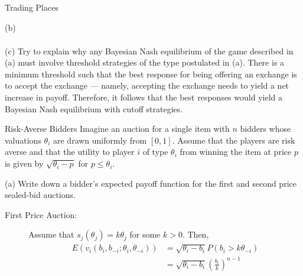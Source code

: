 \documentclass[9pt]{extarticle}
\begin{document}
\begin{problem}{Trading Places}
\begin{problem}{(b)}
\begin{align*}
      \end{align*}
    \end{problem}
    \begin{problem}{(c)}
      Try to explain why any Bayesian Nash equilibrium of the game described in (a) must involve threshold strategies of the type postulated in (a).
      \tcblower
      There is a minimum threshold such that the best response for being offering an exchange is to accept the exchange --- namely, accepting the exchange needs to yield a net increase in payoff. Therefore, it follows that the best responses would yield a Bayesian Nash equilibrium with cutoff strategies.
    \end{problem}
  \end{problem}
  \begin{problem}{Risk-Averse Bidders}
    Imagine an auction for a single item with $n$ bidders whose valuations $\theta_i$ are drawn uniformly from $[0,1]$. Assume that the players are risk averse and that the utility to player $i$ of type $\theta_i$ from winning the item at price $p$ is given by $\sqrt{\theta_i-p}$ for $p \leq \theta_i$.
    \tcblower
    \begin{problem}{(a)}
      Write down a bidder's expected payoff function for the first and second price sealed-bid auctions.
      \tcblower
      \begin{description}
        \item[First Price Auction:] Assume that $s_j(\theta_j) = k\theta_j$ for some $k > 0$. Then,
          \begin{align*}
            E\left(v_i(b_i,b_{-i};\theta_i,\theta_{-i})\right) &= \sqrt{\theta_i - b_i}P(b_i > k\theta_{-i})\\
                                                               &= \sqrt{\theta_i - b_i}\left(\frac{b_i}{k}\right)^{n-1}
          \end{align*}

\end{description}
\end{problem}
\end{problem}
\end{document}
